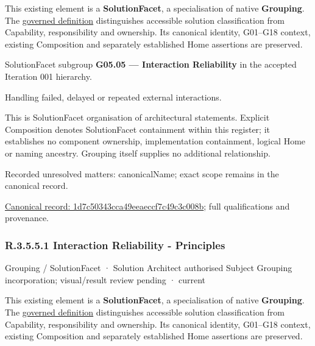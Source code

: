 This existing element is a \textbf{SolutionFacet}, a specialisation of native
\textbf{Grouping}. The \href{\detokenize{../../../../../../../governance/continuum-representation.md#solutionfacet-classification--1119-candidate}}{governed definition}
distinguishes accessible solution classification from Capability, responsibility
and ownership. Its canonical identity, G01–G18 context, existing Composition
and separately established Home assertions are preserved.



SolutionFacet subgroup \textbf{G05.05 — Interaction Reliability} in the accepted Iteration 001 hierarchy.



Handling failed, delayed or repeated external interactions.



This is SolutionFacet organisation of architectural statements. Explicit Composition denotes SolutionFacet containment within this register; it establishes no component ownership, implementation containment, logical Home or naming ancestry. Grouping itself supplies no additional relationship.


{\small Recorded unresolved matters: canonicalName; exact scope remains in the canonical record.}\par
{\footnotesize \href{../../../../../../../continuum/grouping/1d7c50343cca49eeaeccf7c49c3c008b.md}{Canonical record: 1d7c50343cca49eeaeccf7c49c3c008b}; full qualifications and provenance.}\par
\subsubsection*{R.3.5.5.1 Interaction Reliability - Principles}
\label{navigation:R.3.5.5.1}

\label{element:41040498bcaf469686edbee208b9b349}
{\small Grouping / SolutionFacet · Solution Architect authorised Subject Grouping incorporation; visual/result review pending · current}\par

This existing element is a \textbf{SolutionFacet}, a specialisation of native
\textbf{Grouping}. The \href{\detokenize{../../../../../../../governance/continuum-representation.md#solutionfacet-classification--1119-candidate}}{governed definition}
distinguishes accessible solution classification from Capability, responsibility
and ownership. Its canonical identity, G01–G18 context, existing Composition
and separately established Home assertions are preserved.



